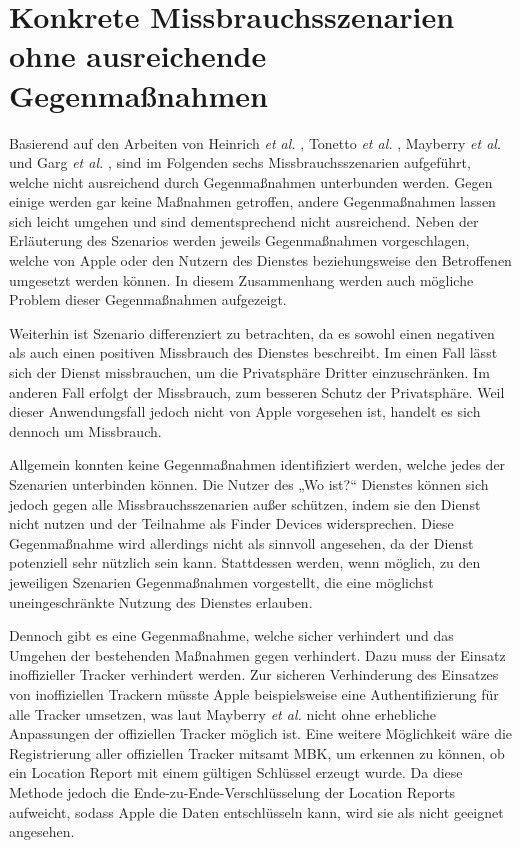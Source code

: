 
\section{Konkrete Missbrauchsszenarien ohne ausreichende Gegenmaßnahmen}
\label{sec:szenarien}

Basierend auf den Arbeiten von Heinrich \textit{et al.} \cite{Heinrich_FindMy}, Tonetto \textit{et al.} \cite{Tonetto_FindMy}, Mayberry \textit{et al.} \cite{Mayberry_Tracking} und Garg \textit{et al.} \cite{Garg_Secure_Tracker}, sind im Folgenden sechs Missbrauchsszenarien aufgeführt, welche nicht ausreichend durch Gegenmaßnahmen unterbunden werden.
Gegen einige werden gar keine Maßnahmen getroffen, andere Gegenmaßnahmen lassen sich leicht umgehen und sind dementsprechend nicht ausreichend.
Neben der Erläuterung des Szenarios werden jeweils Gegenmaßnahmen vorgeschlagen, welche von Apple oder den Nutzern des Dienstes beziehungsweise den Betroffenen umgesetzt werden können.
In diesem Zusammenhang werden auch mögliche Problem dieser Gegenmaßnahmen aufgezeigt.

Weiterhin ist Szenario  differenziert zu betrachten, da es sowohl einen negativen als auch einen positiven Missbrauch des Dienstes beschreibt.
Im einen Fall lässt sich der Dienst missbrauchen, um die Privatsphäre Dritter einzuschränken.
Im anderen Fall erfolgt der Missbrauch, zum besseren Schutz der Privatsphäre.
Weil dieser Anwendungsfall jedoch nicht von Apple vorgesehen ist, handelt es sich dennoch um Missbrauch.


Allgemein konnten keine Gegenmaßnahmen identifiziert werden, welche jedes der Szenarien unterbinden können.
Die Nutzer des „Wo ist?“ Dienstes können sich jedoch gegen alle Missbrauchsszenarien außer  schützen, indem sie den Dienst nicht nutzen und der Teilnahme als Finder Devices widersprechen.
Diese Gegenmaßnahme wird allerdings nicht als sinnvoll angesehen, da der Dienst potenziell sehr nützlich sein kann.
Stattdessen werden, wenn möglich, zu den jeweiligen Szenarien Gegenmaßnahmen vorgestellt, die eine möglichst uneingeschränkte Nutzung des Dienstes erlauben.

Dennoch gibt es eine Gegenmaßnahme, welche  sicher verhindert und das Umgehen der bestehenden Maßnahmen gegen  verhindert.
Dazu muss der Einsatz inoffizieller Tracker verhindert werden.
Zur sicheren Verhinderung des Einsatzes von inoffiziellen Trackern müsste Apple beispielsweise eine Authentifizierung für alle Tracker umsetzen, was laut Mayberry \textit{et al.} \cite{Mayberry_Tracking} nicht ohne erhebliche Anpassungen der offiziellen Tracker möglich ist.
Eine weitere Möglichkeit wäre die Registrierung aller offiziellen Tracker mitsamt \ac{MBK}, um erkennen zu können, ob ein Location Report mit einem gültigen Schlüssel erzeugt wurde.
Da diese Methode jedoch die Ende-zu-Ende-Verschlüsselung der Location Reports aufweicht, sodass Apple die Daten entschlüsseln kann, wird sie als nicht geeignet angesehen.



